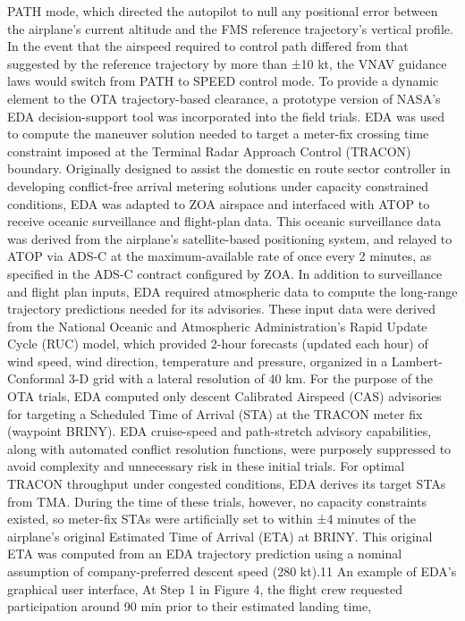 \documentclass{aer1315-pretty}
\begin{document}
\begin{itemize}
PATH mode, which directed the autopilot to null any positional error between the airplane’s current altitude and the
FMS reference trajectory’s vertical profile. In the event that the airspeed required to control path differed from that
suggested by the reference trajectory by more than ±10 kt, the VNAV guidance laws would switch from PATH to
SPEED control mode.
    To provide a dynamic element to the OTA trajectory-based clearance, a prototype version of NASA’s EDA
decision-support tool was incorporated into the field trials. EDA was used to compute the maneuver solution needed
to target a meter-fix crossing time constraint imposed at the Terminal Radar Approach Control (TRACON)
boundary. Originally designed to assist the domestic en route sector controller in developing conflict-free arrival
metering solutions under capacity constrained conditions, EDA was adapted to ZOA airspace and interfaced with
ATOP to receive oceanic surveillance and flight-plan data. This oceanic surveillance data was derived from the
airplane’s satellite-based positioning system, and relayed to ATOP via ADS-C at the maximum-available rate of
once every 2 minutes, as specified in the ADS-C contract configured by ZOA. In addition to surveillance and flight
plan inputs, EDA required atmospheric data to compute the long-range trajectory predictions needed for its
advisories. These input data were derived from the National Oceanic and Atmospheric Administration’s Rapid
Update Cycle (RUC) model, which provided 2-hour forecasts (updated each hour) of wind speed, wind direction,
temperature and pressure, organized in a Lambert-Conformal 3-D grid with a lateral resolution of 40 km.
    For the purpose of the OTA trials, EDA computed only descent Calibrated Airspeed (CAS) advisories for
targeting a Scheduled Time of Arrival (STA) at the TRACON meter fix (waypoint BRINY). EDA cruise-speed and
path-stretch advisory capabilities, along with automated conflict resolution functions, were purposely suppressed to
avoid complexity and unnecessary risk in these initial trials. For optimal TRACON throughput under congested
conditions, EDA derives its target STAs from TMA. During the time of these trials, however, no capacity
constraints existed, so meter-fix STAs were artificially set to within ±4 minutes of the airplane’s original Estimated
Time of Arrival (ETA) at BRINY. This original ETA was computed from an EDA trajectory prediction using a
nominal assumption of company-preferred descent speed (280 kt).11 An example of EDA’s graphical user interface,
    At Step 1 in Figure 4, the flight crew requested participation around 90 min prior to their estimated landing time,

\end{itemize}
\end{document}
